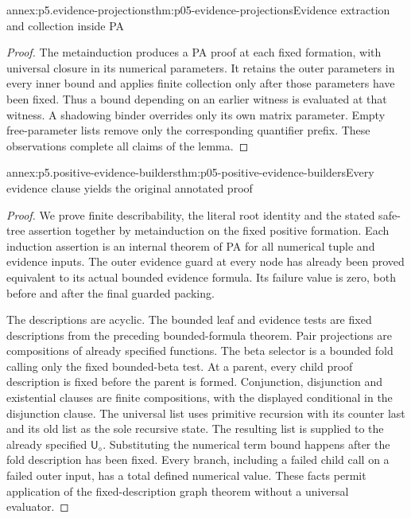 \begin{annexitem}{annex:p5.evidence-projections}{thm:p05-evidence-projections}{Evidence extraction and collection inside PA}
\begin{proof}
The metainduction produces a PA proof at each fixed formation, with
universal closure in its numerical parameters. It retains the outer
parameters in every inner bound and applies finite collection only after
those parameters have been fixed. Thus a bound depending on an earlier
witness is evaluated at that witness. A shadowing binder overrides only
its own matrix parameter. Empty free-parameter lists remove only the
corresponding quantifier prefix. These observations complete all claims
of the lemma.
\end{proof}
\end{annexitem}

\begin{annexitem}{annex:p5.positive-evidence-builders}{thm:p05-positive-evidence-builders}{Every evidence clause yields the original annotated proof}
\begin{proof}
We prove finite describability, the literal root identity and the stated
safe-tree assertion together by metainduction on the fixed positive
formation. Each induction assertion is an internal theorem of PA for
all numerical tuple and evidence inputs. The outer evidence guard at
every node has already been proved equivalent to its actual bounded
evidence formula. Its failure value is zero, both before and after the
final guarded packing.

The descriptions are acyclic. The bounded leaf and evidence tests are
fixed descriptions from the preceding bounded-formula theorem. Pair
projections are compositions of already specified functions. The beta
selector is a bounded fold calling only the fixed bounded-beta test.
At a parent, every child proof description is fixed before the parent
is formed. Conjunction, disjunction and existential clauses are finite
compositions, with the displayed conditional in the disjunction clause.
The universal list uses primitive recursion with its counter last and
its old list as the sole recursive state. The resulting list is supplied
to the already specified \(\mathsf U_\diamond\). Substituting the
numerical term bound happens after the fold description has been fixed.
Every branch, including a failed child call on a failed outer input,
has a total defined numerical value. These facts permit application of
the fixed-description graph theorem without a universal evaluator.


\end{proof}
\end{annexitem}
